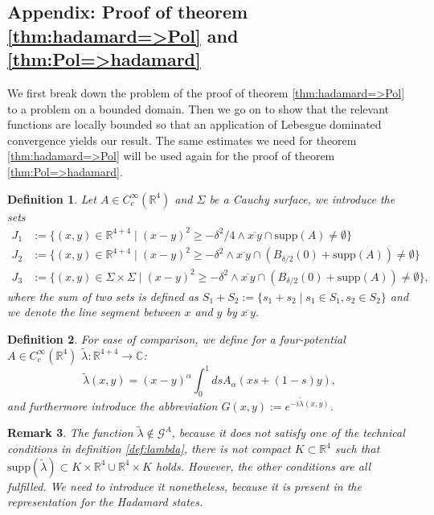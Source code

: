 \documentclass[b5paper,draft,openbib,12pt]{memoir}
\newtheorem{Def}{Definition}
\newtheorem{Remark}[Def]{Remark}
\begin{document}
\subsection{\!Appendix: Proof of theorem \ref{thm:hadamard=>Pol} and \ref{thm:Pol=>hadamard}}

We first break down the problem of the proof of theorem \ref{thm:hadamard=>Pol} to a problem on a bounded domain. Then we go on 
to show that the relevant functions are locally bounded so that an application of Lebesgue dominated convergence yields our result.
The same estimates we need for theorem \ref{thm:hadamard=>Pol} will be used again for the proof of theorem \ref{thm:Pol=>hadamard}.

\begin{Def} Let \(A\in C_c^\infty(\mathbb{R}^4)\) and \(\Sigma\) be a Cauchy surface, we introduce the sets
\begin{align}
J_1&:=\{(x,y)\in\mathbb{R}^{4+4}\mid (x-y)^2\ge -\delta^2/4 \wedge \overline{x~y} \cap \mathrm{supp}(A)\neq \emptyset\}\\
J_2&:=\{(x,y)\in\mathbb{R}^{4+4}\mid (x-y)^2\ge -\delta^2 \wedge \overline{x~y} \cap \left(B_{\delta/2}(0)+\mathrm{supp}(A)\right)\neq \emptyset\}\\
J_3&:=\{(x,y)\in \Sigma \times \Sigma \mid (x-y)^2 \ge-\delta^2\wedge \overline{x ~ y} \cap \left(B_{\delta/2}(0)+\mathrm{supp}(A) \right)\neq \emptyset \},
\end{align}
where the sum of two sets is defined as \(S_1+S_2:=\{s_1+s_2\mid s_1\in S_1, s_2\in S_2\}\) and we denote the line segment between \(x\) and \(y\) by \(\overline{x~y}\). 
\end{Def}

\begin{Def}
For ease of comparison, we define for a four-potential \(A\in C_c^\infty(\mathbb{R}^4)\)
\(\tilde{\lambda}:\mathbb{R}^{4+4}\rightarrow \mathbb{C}\):
\begin{equation}
\tilde{\lambda}(x,y)= (x-y)^\alpha\int_0^1 ds A_\alpha (x s + (1-s)y),
\end{equation}
and furthermore introduce the abbreviation \(G(x,y):=e^{-i \tilde{\lambda}(x,y)} \).
\end{Def}

\begin{Remark}
The function \(\tilde{\lambda}\not\in \mathcal{G}^A\), because it does not satisfy one of the technical conditions in definition
\ref{def:lambda}, there is not compact \(K\subset\mathbb{R}^4\) such that 
\(\mathrm{supp}(\tilde{\lambda})\subset K\times \mathbb{R}^4 \cup \mathbb{R}^4\times K\) holds. However, the other conditions are all fulfilled. 
We need to introduce it nonetheless, because it is present in the representation for the Hadamard states.
\end{Remark}
\end{document}
